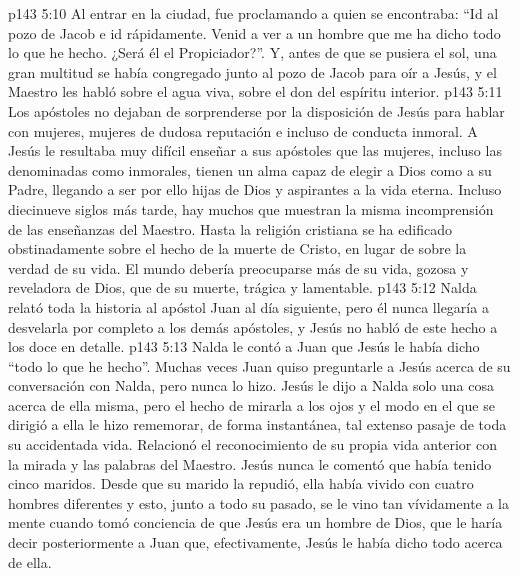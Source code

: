 \vs p143 5:10 Al entrar en la ciudad, fue proclamando a quien se encontraba: “Id al pozo de Jacob e id rápidamente. Venid a ver a un hombre que me ha dicho todo lo que he hecho. ¿Será él el Propiciador?”. Y, antes de que se pusiera el sol, una gran multitud se había congregado junto al pozo de Jacob para oír a Jesús, y el Maestro les habló sobre el agua viva, sobre el don del espíritu interior.
\vs p143 5:11 Los apóstoles no dejaban de sorprenderse por la disposición de Jesús para hablar con mujeres, mujeres de dudosa reputación e incluso de conducta inmoral. A Jesús le resultaba muy difícil enseñar a sus apóstoles que las mujeres, incluso las denominadas como inmorales, tienen un alma capaz de elegir a Dios como a su Padre, llegando a ser por ello hijas de Dios y aspirantes a la vida eterna. Incluso diecinueve siglos más tarde, hay muchos que muestran la misma incomprensión de las enseñanzas del Maestro. Hasta la religión cristiana se ha edificado obstinadamente sobre el hecho de la muerte de Cristo, en lugar de sobre la verdad de su vida. El mundo debería preocuparse más de su vida, gozosa y reveladora de Dios, que de su muerte, trágica y lamentable.
\vs p143 5:12 Nalda relató toda la historia al apóstol Juan al día siguiente, pero él nunca llegaría a desvelarla por completo a los demás apóstoles, y Jesús no habló de este hecho a los doce en detalle.
\vs p143 5:13 Nalda le contó a Juan que Jesús le había dicho “todo lo que he hecho”. Muchas veces Juan quiso preguntarle a Jesús acerca de su conversación con Nalda, pero nunca lo hizo. Jesús le dijo a Nalda solo una cosa acerca de ella misma, pero el hecho de mirarla a los ojos y el modo en el que se dirigió a ella le hizo rememorar, de forma instantánea, tal extenso pasaje de toda su accidentada vida. Relacionó el reconocimiento de su propia vida anterior con la mirada y las palabras del Maestro. Jesús nunca le comentó que había tenido cinco maridos. Desde que su marido la repudió, ella había vivido con cuatro hombres diferentes y esto, junto a todo su pasado, se le vino tan vívidamente a la mente cuando tomó conciencia de que Jesús era un hombre de Dios, que le haría decir posteriormente a Juan que, efectivamente, Jesús le había dicho todo acerca de ella.
